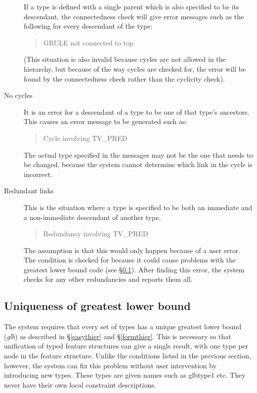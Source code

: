 \documentclass[12pt]{report}
\newenvironment{error}%
{\begin{quote}
\tt
}%
{\end{quote}
}
\newcommand{\newterm}[1]{{\it #1}}
\begin{document}
\begin{description}
If a type is defined with a single parent which is also specified to be its 
descendant, the connectedness check will give error messages such as the
following for every descendant of the type:
\begin{error}
GRULE not connected to top
\end{error}
(This situation is also invalid because cycles are not allowed in the
hierarchy, but because of the way cycles are checked for, the error will be
found by the connectedness check rather than the cyclicity check).
\item[No cycles]
It is an error for a descendant of a type to be one of that type's ancestors.
This causes an error message to be generated such as:
\begin{error}
Cycle involving TV\_PRED
\end{error}
The actual type specified in the
messages may not be the one that needs to be changed,
because the system cannot determine which link in the cycle is incorrect.
\item[Redundant links] This is the situation where a type is
specified to be both an immediate and a non-immediate descendant of another type.
\begin{error}
Redundancy involving TV\_PRED
\end{error}
The assumption is that this would only happen because of a user error.
The condition is checked for because it could cause problems with the
greatest lower bound code (see \S\ref{glbgen}).
After finding this error, the system checks for any other redundancies
and reports them all.
\end{description}

\subsection{Uniqueness of greatest lower bound}
\label{glbgen}
  
The system requires that every set of types has a unique greatest lower bound
(\newterm{glb})
as described in \S\ref{easythier} and \S\ref{formthier}.  
This is necessary so that unification of typed feature structures
can give a single result, with one type per node in the feature structure.
Unlike the conditions listed in the previous section, however, the system can
fix this problem without user intervention by introducing new types.  These
types are given names such as {\type glbtype1} etc.  They never have 
their own local constraint descriptions.
\end{document}
